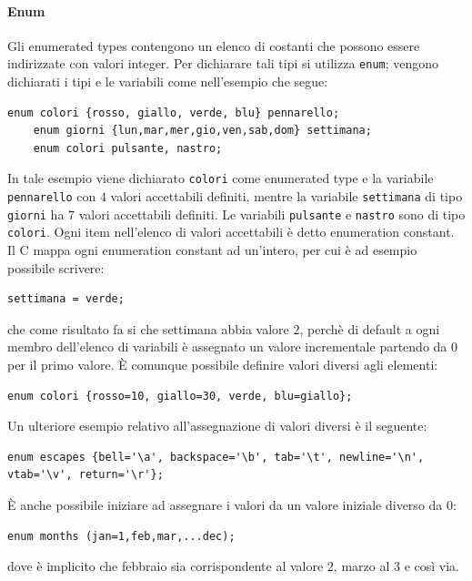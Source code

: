 \documentclass[oneside]{scrbook}
\begin{document}
\paragraph{Enum}
Gli enumerated types contengono un elenco di costanti che possono essere indirizzate con valori integer. Per dichiarare tali tipi si utilizza \texttt{enum}; vengono dichiarati i tipi e le variabili come nell'esempio che segue:
\begin{lstlisting}[style=cstyle]
	enum colori {rosso, giallo, verde, blu} pennarello;
	enum giorni {lun,mar,mer,gio,ven,sab,dom} settimana;
	enum colori pulsante, nastro;
\end{lstlisting}

In tale esempio viene dichiarato \texttt{colori} come enumerated type e la variabile \texttt{pennarello} con $4$ valori accettabili definiti, mentre la variabile \texttt{settimana} di tipo \texttt{giorni} ha $7$ valori accettabili definiti. Le variabili \texttt{pulsante} e \texttt{nastro} sono di tipo \texttt{colori}. Ogni item nell'elenco di valori accettabili \`e detto enumeration constant. Il C mappa ogni enumeration constant ad un'intero, per cui \`e ad esempio possibile scrivere:
\begin{lstlisting}[style=cstyle]
	settimana = verde;
\end{lstlisting}
che come risultato fa si che settimana abbia valore $2$, perch\`e di default a ogni membro dell'elenco di variabili \`e assegnato un valore incrementale partendo da $0$ per il primo valore. \`E comunque possibile definire valori diversi agli elementi:
\begin{lstlisting}[style=cstyle]
	enum colori {rosso=10, giallo=30, verde, blu=giallo};
\end{lstlisting}

Un ulteriore esempio relativo all'assegnazione di valori diversi \`e il seguente:
\begin{lstlisting}[style=cstyle]
	enum escapes {bell='\a', backspace='\b', tab='\t', newline='\n', vtab='\v', return='\r'};
\end{lstlisting}
\`E anche possibile iniziare ad assegnare i valori da un valore iniziale diverso da $0$:
\begin{lstlisting}[style=cstyle]
	enum months (jan=1,feb,mar,...dec);
\end{lstlisting}
dove \`e implicito che febbraio sia corrispondente al valore $2$, marzo al $3$ e cos\`i via.
\end{document}
